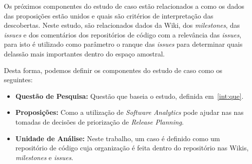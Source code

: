Os próximos componentes do estudo de caso estão relacionados a como os dados das proposições estão unidos e quais são critérios de interpretação das descobertas. Neste estudo, são relacionados dados da Wiki, dos \textit{milestones}, das \textit{issues} e dos comentários dos repositórios de código com a relevância das \textit{issues}, para isto é utilizado como parâmetro o ranque das \textit{issues} para determinar quais delassão mais importantes dentro do espaço amostral.

Desta forma, podemos definir os componentes do estudo de caso como os seguintes:

\begin{itemize}
    \item \textbf{Questão de Pesquisa:} Questão que baseia o estudo, definida em~\ref{int:que}.
    \item \textbf{Proposições:} Como a utilização de \textit{Software Analytics} pode ajudar nas
    nas tomadas de decisões de priorização de \textit{Release Planning}.
    \item \textbf{Unidade de Análise:} Neste trabalho, um caso é definido como um repositório
        de código cuja organização é feita dentro do repositório nas Wikis, \textit{milestones}
        e \textit{issues}.
\end{itemize}

